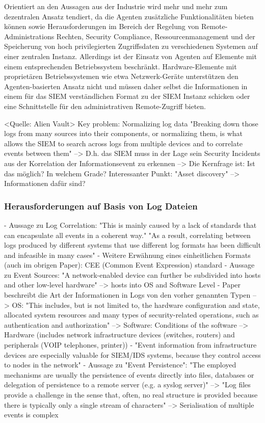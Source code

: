 Orientiert an den Aussagen aus der Industrie wird mehr und mehr zum dezentralen Ansatz tendiert, da die Agenten zusätzliche Funktionalitäten bieten können sowie Herausforderungen im Bereich der Regelung von Remote-Administrations Rechten, Security Compliance, Ressourcenmanagement und der Speicherung von hoch privilegierten Zugriffsdaten zu verschiedenen Systemen auf einer zentralen Instanz. Allerdings ist der Einsatz von Agenten auf Elemente mit einem entsprechenden Betriebssystem beschränkt. Hardware-Elemente mit proprietären Betriebssystemen wie etwa Netzwerk-Geräte unterstützen den Agenten-basierten Ansatz nicht und müssen daher selbst die Informationen in einem für das SIEM verständlichen Format zu der SIEM Instanz schicken oder eine Schnittstelle für den administrativen Remote-Zugriff bieten.

<Quelle: Alien Vault>
Key problem: Normalizing log data
"Breaking down those logs from many sources into their components, or normalizing them, 
is what allows the SIEM to search across logs from multiple devices and to correlate events 
between them"
--> D.h. das SIEM muss in der Lage sein Security Incidents aus der Korrelation der Informationsevent zu erkennen
--> Die Kernfrage ist: Ist das möglich? In welchem Grade?
Interessanter Punkt: "Asset discovery" --> Informationen dafür sind?

\subsubsection{Herausforderungen auf Basis von Log Dateien}
- Aussage zu Log Correlation: "This is mainly caused by a lack of standards that can encapsulate all events in a coherent way."
				"As a result, correlating between logs produced by different systems that use different log formats has been difficult and infeasible in many cases"
- Weitere Erwähnung eines einheitlichen Formats (auch im obrigen Paper): CEE (Common Event Expression) standard
- Aussage zu Event Sources: "A network-enabled device can further be subdivided into hosts and other low-level hardware"
	--> hosts into OS and Software Level
- Paper beschreibt die Art der Informationen in Logs von den vorher genannten Typen
	--> OS: "This includes, but is not limited to, the hardware configuration and state, allocated system resources and many types of security-related operations, such as authentication and authorization"
	--> Software: Conditions of the software
	--> Hardware (includes network infrastructure devices (switches, routers) and peripherals (VOIP telephones, printer))
		- "Event information from infrastructure devices are especially valuable for SIEM/IDS systems, because they control access to nodes in the network"
- Aussage zu "Event Persistence": "The employed mechanisms are usually the persistence of events directly into files, databases or delegation of persistence to a remote server (e.g. a syslog server)"
	--> "Log files provide a challenge in the sense that, often, no real structure is provided because there is typically only a single stream of characters"
	--> Serialisation of multiple events is complex
		 
